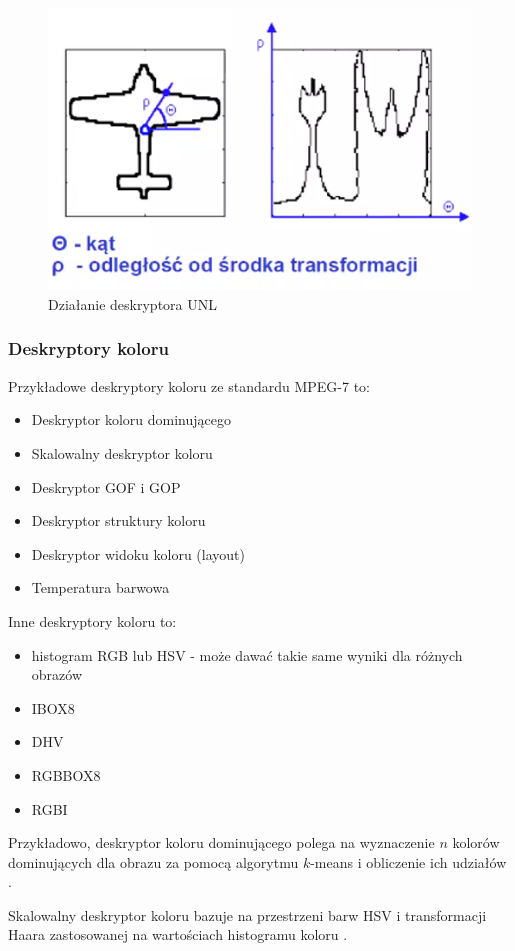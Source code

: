 \documentclass[wi]{zut}
\begin{document}
\begin{figure}[H]
    \centering
    \includegraphics[width=0.5\linewidth]{images/unl.png}
    \caption{Działanie deskryptora UNL}
    \label{fig:unl}
\end{figure}

\subsubsection{Deskryptory koloru}

Przykładowe deskryptory koloru ze standardu MPEG-7 to:

\begin{itemize}
    \item Deskryptor koloru dominującego
    \item Skalowalny deskryptor koloru
    \item Deskryptor GOF i GOP
    \item Deskryptor struktury koloru
    \item Deskryptor widoku koloru (layout)
    \item Temperatura barwowa \cite{Frejlichowski2020_6}
\end{itemize}

Inne deskryptory koloru to:

\begin{itemize}
\item histogram RGB lub HSV - może dawać takie same wyniki dla różnych obrazów
\item IBOX8
\item DHV
\item RGBBOX8
\item RGBI \cite{Frejlichowski2020_6}
\end{itemize}

Przykładowo, deskryptor koloru dominującego polega na wyznaczenie $n$ kolorów dominujących dla obrazu za pomocą algorytmu $k$-means i obliczenie ich udziałów \cite{Frejlichowski2020_6}.

Skalowalny deskryptor koloru bazuje na przestrzeni barw HSV i transformacji Haara zastosowanej na wartościach histogramu koloru \cite{Frejlichowski2020_6}.
\end{document}
